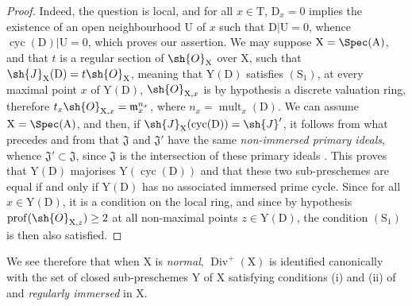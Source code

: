\begin{proof}
Indeed, the question is local, and for all $x\in\mathrm{T}$, $\mathrm{D}_x=0$ implies the existence of an open neighbourhood $\mathrm{U}$ of $x$ such that $\mathrm{D}|\mathrm{U}=0$, whence $\operatorname{cyc}(\mathrm{D})|\mathrm{U}=0$, which proves our assertion.
We may suppose $\mathrm{X}=\Spec(\mathrm{A})$, and that $t$ is a regular section of $\sh{O}_\mathrm{X}$ over $\mathrm{X}$, such that $\sh{J}_\mathrm{X}(\mathrm{D})=t\sh{O}_\mathrm{X}$, meaning that $\mathrm{Y}(\mathrm{D})$ satisfies $(\mathrm{S}_1)$, at every maximal point $x$ of $\mathrm{Y}(\mathrm{D})$, $\sh{O}_{\mathrm{X},x}$ is by hypothesis a discrete valuation ring, therefore $t_x\sh{O}_{\mathrm{X},x}=\mathfrak{m}_x^{n_x}$, where $n_x=\operatorname{mult}_x(\mathrm{D})$.
We can assume $\mathrm{X}=\Spec(\mathrm{A})$, and then, if $\sh{J}_\mathrm{X}(\operatorname{cyc}(\mathrm{D}))=\sh{J}'$, it follows from what precedes and from  that $\mathfrak{J}$ and $\mathfrak{J}'$ have the same \emph{non-immersed primary ideals}, whence $\mathfrak{J}'\subset\mathfrak{J}$, since $\mathfrak{J}$ is the intersection of
these primary ideals .
This proves that $\mathrm{Y}(\mathrm{D})$ majorises $\mathrm{Y}(\operatorname{cyc}(\mathrm{D}))$ and that these two sub-preschemes are equal if and only if $\mathrm{Y}(\mathrm{D})$ has no associated immersed prime cycle.
Since for all $x\in\mathrm{Y}(\mathrm{D})$, it is a condition on the local ring, and since by hypothesis $\operatorname{prof}(\sh{O}_{\mathrm{X},z})\geq 2$ at all non-maximal points $z\in\mathrm{Y}(\mathrm{D})$, the condition $(\mathrm{S}_1)$ is then also satisfied.
\end{proof}

\begin{env}[21.7.3.1]
\label{IV.21.7.3.1}
We see therefore that when $\mathrm{X}$ is \emph{normal}, $\operatorname{Div}^+(\mathrm{X})$ is identified canonically with the set of closed sub-preschemes $\mathrm{Y}$ of $\mathrm{X}$ satisfying conditions (i) and (ii) of  and \emph{regularly immersed} in $\mathrm{X}$.
\end{env}

